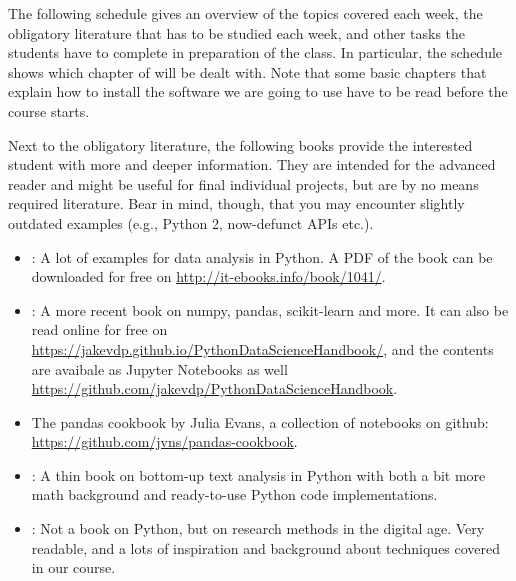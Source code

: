 
The following schedule gives an overview of the topics covered each week, the obligatory literature that has to be studied each week, and other tasks the students have to complete in preparation of the class.
In particular, the schedule shows which chapter of \cite{cssbook} will be dealt with. Note that some basic chapters that explain how to install the software we are going to use have to be read before the course starts.

Next to the obligatory literature, the following books provide the interested student with more and deeper information. They are intended for the advanced reader and might be useful for final individual projects, but are by no means required literature. Bear in mind, though, that you may encounter slightly outdated examples (e.g., Python 2, now-defunct APIs etc.).

\begin{itemize}
\item \citealp{McKinney2012}: A lot of examples for data analysis in Python. A PDF of the book can be downloaded for free on \url{http://it-ebooks.info/book/1041/}.
\item \citealp{VanderPlas2016}: A more recent book on numpy, pandas, scikit-learn and more. It can also be read online for free on \url{https://jakevdp.github.io/PythonDataScienceHandbook/}, and the contents are avaibale as Jupyter Notebooks as well \url{https://github.com/jakevdp/PythonDataScienceHandbook}.
\item The pandas cookbook by Julia Evans, a collection of notebooks on github: \url{https://github.com/jvns/pandas-cookbook}.
\item \citealp{Hovy2020}: A thin book on bottom-up text analysis in Python with both a bit more math background and ready-to-use Python code implementations.
\item \citealp{Salganik2017}: Not a book on Python, but on research methods in the digital age. Very readable, and a lots of inspiration and background about techniques covered in our course.
\end{itemize}
